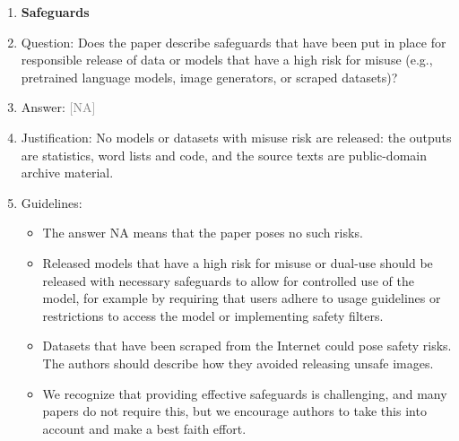 \documentclass[10pt,letterpaper]{article}
\newcommand{\answerNA}[1][]{\textcolor{gray}{[NA] #1}}
\begin{document}
\begin{enumerate}
\item {\bf Safeguards}
    \item[] Question: Does the paper describe safeguards that have been put in place for responsible release of data or models that have a high risk for misuse (e.g., pretrained language models, image generators, or scraped datasets)?
    \item[] Answer: \answerNA{}
    \item[] Justification: No models or datasets with misuse risk are released: the outputs are statistics, word lists and code, and the source texts are public-domain archive material.
    \item[] Guidelines:
    \begin{itemize}
        \item The answer NA means that the paper poses no such risks.
        \item Released models that have a high risk for misuse or dual-use should be released with necessary safeguards to allow for controlled use of the model, for example by requiring that users adhere to usage guidelines or restrictions to access the model or implementing safety filters. 
        \item Datasets that have been scraped from the Internet could pose safety risks. The authors should describe how they avoided releasing unsafe images.
        \item We recognize that providing effective safeguards is challenging, and many papers do not require this, but we encourage authors to take this into account and make a best faith effort.
    \end{itemize}


\end{enumerate}
\end{document}
